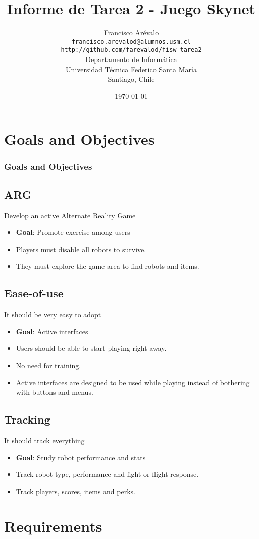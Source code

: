 \documentclass{beamer}
\title{Informe de Tarea 2 - Juego Skynet}
\author{Francisco Ar\'evalo\\
  \texttt{francisco.arevalod@alumnos.usm.cl}\\
  \texttt{http://github.com/farevalod/fisw-tarea2}\\
  \vspace{10mm}
  Departamento de Inform\'atica\\
  Universidad T\'ecnica Federico Santa Mar\'ia\\
  Santiago, Chile}
\date{\today}
\begin{document}
\maketitle
\tableofcontents
\section{Goals and Objectives}
\begin{frame}
\frametitle{Goals and Objectives}
\subsection{ARG}
Develop an active Alternate Reality Game
\begin{itemize}
	\item \textbf{Goal}: Promote exercise among users
	\item Players must disable all robots to survive. 
	\item They must explore the game area to find robots and items.
\end{itemize}
\subsection{Ease-of-use}
It should be very easy to adopt
\begin{itemize}
	\item \textbf{Goal}: Active interfaces
	\item Users should be able to start playing right away. 
	\item No need for training.
	\item Active interfaces are designed to be used while playing instead of bothering with buttons and menus.
\end{itemize}
\subsection{Tracking}
It should track everything
\begin{itemize}
	\item \textbf{Goal}: Study robot performance and stats
	\item Track robot type, performance and fight-or-flight response.
	\item Track players, scores, items and perks.
\end{itemize}
\end{frame}
\section{Requirements}
\end{document}
